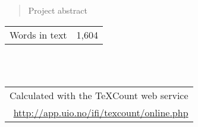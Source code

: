 \documentclass[a4paper,twoside,notitlepage,11pt]{article}
\begin{document}
%
%
%
%

\pagestyle{empty}

\cleardoublepage

%
%
%
%

\begin{abstract}
{\color{red} Project abstract}
\end{abstract}

\null
\vfill
\begin{flushright}
	\begin{tabular}{r|l}
		Words in text	& 1,604 \\
	\end{tabular}
	\ \\
	\ \\
	\begin{tabular}{cc}
		\multicolumn{2}{r}{Calculated with the TeXCount web service}\\
		\multicolumn{2}{r}{\url{http://app.uio.no/ifi/texcount/online.php}}
	\end{tabular}
\end{flushright}

\cleardoublepage

%
%
%
%

\setlength{\cftbeforesecskip}{0.6ex}
\tableofcontents
\cleardoublepage

%
%
%
%

\newpage
\pagestyle{plain}
\setcounter{page}{1}


\newpage 

\newpage 

\newpage 

\newpage 

\newpage 

\newpage 

\newpage 

\newpage 

\newpage 

\newpage 


%
%
%
%

\newpage
\pagestyle{biblio}





%
%
% 
%
\newpage
\pagestyle{appendix}
\appendix



%
%
%
%
\end{document}
